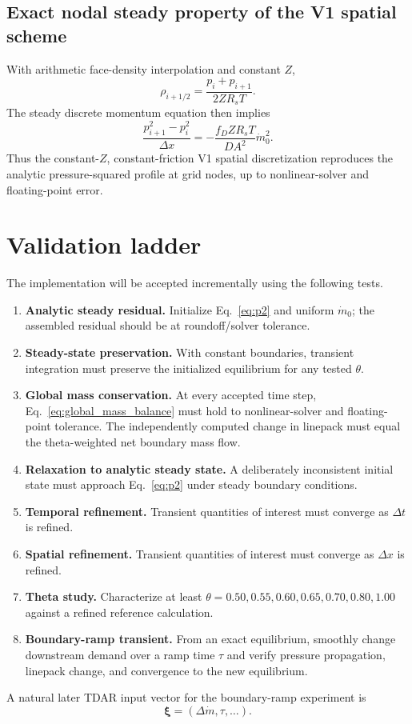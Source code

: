 \documentclass[11pt]{article}
\newcommand{\mdot}{\dot m}
\begin{document}
\subsection{Exact nodal steady property of the V1 spatial scheme}
With arithmetic face-density interpolation and constant $Z$,
\begin{equation}
\rho_{i+1/2}=\frac{p_i+p_{i+1}}{2ZR_sT}.
\end{equation}
The steady discrete momentum equation then implies
\begin{equation}
\boxed{
\frac{p_{i+1}^2-p_i^2}{\Delta x}
=-\frac{f_DZR_sT}{DA^2}\mdot_0^2.}
\label{eq:discretep2}
\end{equation}
Thus the constant-$Z$, constant-friction V1 spatial discretization reproduces the analytic pressure-squared profile at grid nodes, up to nonlinear-solver and floating-point error.

\section{Validation ladder}
The implementation will be accepted incrementally using the following tests.
\begin{enumerate}
\item \textbf{Analytic steady residual.} Initialize Eq.~\eqref{eq:p2} and uniform $\mdot_0$; the assembled residual should be at roundoff/solver tolerance.
\item \textbf{Steady-state preservation.} With constant boundaries, transient integration must preserve the initialized equilibrium for any tested $\theta$.
\item \textbf{Global mass conservation.} At every accepted time step, Eq.~\eqref{eq:global_mass_balance} must hold to nonlinear-solver and floating-point tolerance.  The independently computed change in linepack must equal the theta-weighted net boundary mass flow.
\item \textbf{Relaxation to analytic steady state.} A deliberately inconsistent initial state must approach Eq.~\eqref{eq:p2} under steady boundary conditions.
\item \textbf{Temporal refinement.} Transient quantities of interest must converge as $\Delta t$ is refined.
\item \textbf{Spatial refinement.} Transient quantities of interest must converge as $\Delta x$ is refined.
\item \textbf{Theta study.} Characterize at least $\theta=0.50,0.55,0.60,0.65,0.70,0.80,1.00$ against a refined reference calculation.
\item \textbf{Boundary-ramp transient.} From an exact equilibrium, smoothly change downstream demand over a ramp time $\tau$ and verify pressure propagation, linepack change, and convergence to the new equilibrium.
\end{enumerate}
A natural later TDAR input vector for the boundary-ramp experiment is
\begin{equation}
\bm\xi=(\Delta\mdot,\tau,\ldots).
\end{equation}
\end{document}
